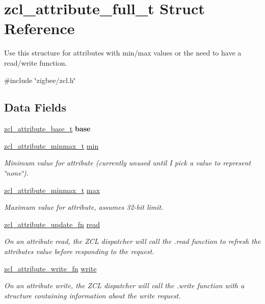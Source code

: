 \hypertarget{structzcl__attribute__full__t}{}\section{zcl\+\_\+attribute\+\_\+full\+\_\+t Struct Reference}
\label{structzcl__attribute__full__t}


Use this structure for attributes with min/max values or the need to have a read/write function.  




{\ttfamily \#include \char`\"{}zigbee/zcl.\+h\char`\"{}}

\subsection*{Data Fields}
\begin{DoxyCompactItemize}
\item 
\hyperlink{structzcl__attribute__base__t}{zcl\+\_\+attribute\+\_\+base\+\_\+t} {\bfseries base}
\item 
\hyperlink{unionzcl__attribute__minmax__t}{zcl\+\_\+attribute\+\_\+minmax\+\_\+t} \hyperlink{group__zcl_gaad888af9d07cd3b611c75f15f8c90dfe}{min}
\begin{DoxyCompactList}\small\item\em Minimum value for attribute (currently unused until I pick a value to represent \char`\"{}none\char`\"{}). \end{DoxyCompactList}\item 
\hyperlink{unionzcl__attribute__minmax__t}{zcl\+\_\+attribute\+\_\+minmax\+\_\+t} \hyperlink{group__zcl_gae2490849003f8344782c06334b1e6b17}{max}
\begin{DoxyCompactList}\small\item\em Maximum value for attribute, assumes 32-\/bit limit. \end{DoxyCompactList}\item 
\hyperlink{group__zcl_gace94cfc3f22379fa08a5b8de8c6977f6}{zcl\+\_\+attribute\+\_\+update\+\_\+fn} \hyperlink{group__zcl_ga80943597b8cce9d751a45efa823596ac}{read}
\begin{DoxyCompactList}\small\item\em On an attribute read, the Z\+CL dispatcher will call the .read function to refresh the attribute\textquotesingle{}s value before responding to the request. \end{DoxyCompactList}\item 
\hyperlink{group__zcl_ga70fa1740c517a1e49c700cba7cf6b339}{zcl\+\_\+attribute\+\_\+write\+\_\+fn} \hyperlink{group__zcl_gac8bd2f85f7df500d34b1d3cd27033a4e}{write}
\begin{DoxyCompactList}\small\item\em On an attribute write, the Z\+CL dispatcher will call the .write function with a structure containing information about the write request. \end{DoxyCompactList}\end{DoxyCompactItemize}


